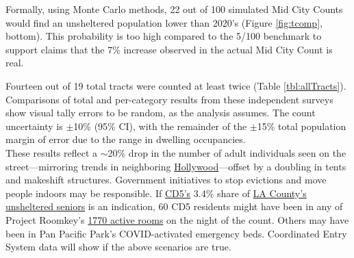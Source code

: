 \documentclass[11pt]{article}
\begin{document}
Formally, using Monte Carlo methods, 22 out of 100 simulated Mid City Counts would find an 
unsheltered population lower than 2020's (Figure \ref{fig:tcomp}, bottom). This probability is too high 
compared to the 5/100 benchmark to support claims that the 7\% increase observed in the actual 
Mid City Count is real.


Fourteen out of 19 total tracts were counted at least twice (Table \ref{tbl:allTracts}). 
Comparisons of total and per-category results from these independent surveys show visual 
tally errors to be random, as the analysis assumes. The count uncertainty is $\pm$10\% (95\% CI), 
with the remainder of the $\pm$15\% total population margin of error due to the range in 
dwelling occupancies.\\

 These results reflect a $\sim$20\% drop in the number
of adult individuals seen on the street---mirroring trends in neighboring 
\href{https://www.latimes.com/homeless-housing/story/2021-04-13/despite-appearances-15-fewer-homeless-people-were-on-hollywood-streets-this-year}{Hollywood}---offset by a doubling in tents and 
makeshift structures. Government initiatives to stop evictions and move people indoors may be 
responsible. If \href{https://www.lahsa.org/documents?id=4664-2020-homeless-count-council-district-5}{CD5's} 3.4\% share of \href{https://www.lahsa.org/documents?id=4585-2020-greater-los-angeles-homeless-count-los-angeles-continuum-of-care-coc-}{LA County's unsheltered seniors} 
is an indication, 60 CD5 residents might have been in any of Project Roomkey's 
\href{https://projectroomkeytracker.com/}{1770 active rooms} on the night of the count. Others
may have been in Pan Pacific Park's COVID-activated emergency beds. Coordinated Entry System data 
will show if the above scenarios are true.
\end{document}

